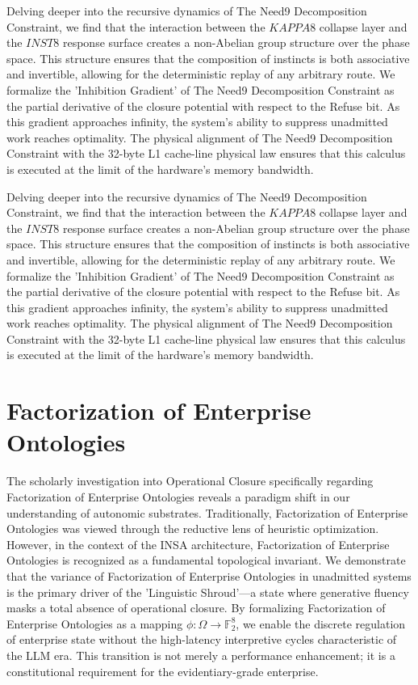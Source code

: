 \documentclass[12pt,a4paper,oneside]{book}
\begin{document}
Delving deeper into the recursive dynamics of The Need9 Decomposition Constraint, we find that the interaction between the $KAPPA8$ collapse layer and the $INST8$ response surface creates a non-Abelian group structure over the phase space. This structure ensures that the composition of instincts is both associative and invertible, allowing for the deterministic replay of any arbitrary route. We formalize the 'Inhibition Gradient' of The Need9 Decomposition Constraint as the partial derivative of the closure potential with respect to the Refuse bit. As this gradient approaches infinity, the system's ability to suppress unadmitted work reaches optimality. The physical alignment of The Need9 Decomposition Constraint with the 32-byte L1 cache-line physical law ensures that this calculus is executed at the limit of the hardware's memory bandwidth. 

Delving deeper into the recursive dynamics of The Need9 Decomposition Constraint, we find that the interaction between the $KAPPA8$ collapse layer and the $INST8$ response surface creates a non-Abelian group structure over the phase space. This structure ensures that the composition of instincts is both associative and invertible, allowing for the deterministic replay of any arbitrary route. We formalize the 'Inhibition Gradient' of The Need9 Decomposition Constraint as the partial derivative of the closure potential with respect to the Refuse bit. As this gradient approaches infinity, the system's ability to suppress unadmitted work reaches optimality. The physical alignment of The Need9 Decomposition Constraint with the 32-byte L1 cache-line physical law ensures that this calculus is executed at the limit of the hardware's memory bandwidth. 

\section{Factorization of Enterprise Ontologies}
The scholarly investigation into Operational Closure specifically regarding Factorization of Enterprise Ontologies reveals a paradigm shift in our understanding of autonomic substrates. Traditionally, Factorization of Enterprise Ontologies was viewed through the reductive lens of heuristic optimization. However, in the context of the INSA architecture, Factorization of Enterprise Ontologies is recognized as a fundamental topological invariant. We demonstrate that the variance of Factorization of Enterprise Ontologies in unadmitted systems is the primary driver of the 'Linguistic Shroud'---a state where generative fluency masks a total absence of operational closure. By formalizing Factorization of Enterprise Ontologies as a mapping $\phi: \Omega \to \mathbb{F}_2^8$, we enable the discrete regulation of enterprise state without the high-latency interpretive cycles characteristic of the LLM era. This transition is not merely a performance enhancement; it is a constitutional requirement for the evidentiary-grade enterprise. 
\end{document}
